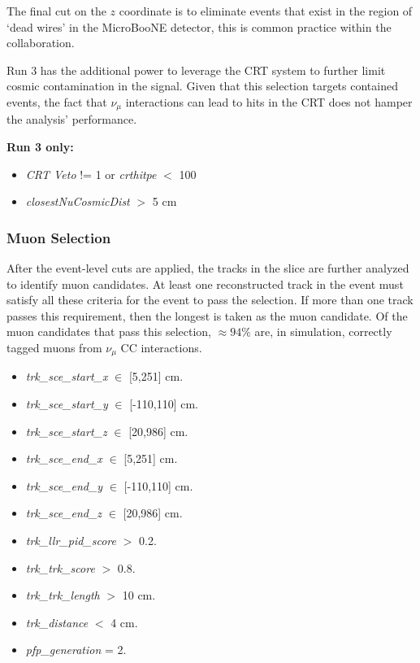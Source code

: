\par \noindent The final cut on the $z$ coordinate is to eliminate events that exist in the region of `dead wires' in the MicroBooNE detector, this is common practice within the collaboration.

\par \noindent Run 3 has the additional power to leverage the CRT system to further limit cosmic contamination in the signal. Given that this selection targets contained events, the fact that $\nu_{\mu}$ interactions can lead to hits in the CRT does not hamper the analysis' performance.

\textbf{Run 3 only:}
\begin{itemize}
    \item \emph{CRT Veto} != 1 or \emph{crthitpe} $<$ 100
    \item \emph{closestNuCosmicDist} $>$ 5 cm
\end{itemize}

\subsubsection{Muon Selection}
\label{sssec:NuMUCCsel:constr:muonsel}

\par After the event-level cuts are applied, the tracks in the slice are further analyzed to identify muon candidates. At least one reconstructed track in the event must satisfy all these criteria for the event to pass the selection. If more than one track passes this requirement, then the longest is taken as the muon candidate. Of the muon candidates that pass this selection, $\approx 94\%$ are, in simulation, correctly tagged muons from $\nu_{\mu}$ CC interactions.

\begin{itemize}
    \item \emph{trk\_sce\_start\_x} $\in$ [5,251] cm.
    \item \emph{trk\_sce\_start\_y} $\in$ [-110,110] cm.
    \item \emph{trk\_sce\_start\_z} $\in$ [20,986] cm.
    \item \emph{trk\_sce\_end\_x} $\in$ [5,251] cm.
    \item \emph{trk\_sce\_end\_y} $\in$ [-110,110] cm.
    \item \emph{trk\_sce\_end\_z} $\in$ [20,986] cm.
    \item \emph{trk\_llr\_pid\_score} $>$ 0.2.
    \item \emph{trk\_trk\_score} $>$ 0.8.
    \item \emph{trk\_trk\_length} $>$ 10 cm.
    \item \emph{trk\_distance} $<$ 4 cm.
    \item \emph{pfp\_generation} = 2.
\end{itemize}

